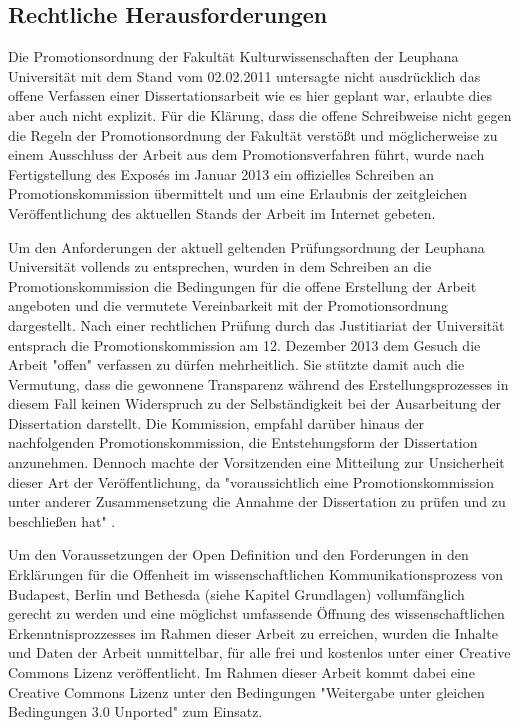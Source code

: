 \subsection{Rechtliche Herausforderungen}

Die Promotionsordnung der Fakultät Kulturwissenschaften der Leuphana Universität mit dem Stand vom 02.02.2011 \cite{promotionsordnung_leuphana_kuwi_2011} untersagte nicht ausdrücklich das offene Verfassen einer Dissertationsarbeit wie es hier geplant war, erlaubte dies aber auch nicht explizit. Für die Klärung, dass die offene Schreibweise nicht gegen die Regeln der Promotionsordnung der Fakultät verstößt und möglicherweise zu einem Ausschluss der Arbeit aus dem Promotionsverfahren führt, wurde nach Fertigstellung des Exposés im Januar 2013 ein offizielles Schreiben an Promotionskommission übermittelt \cite{heise_2013_schreiben_kommission} und um eine Erlaubnis der zeitgleichen Veröffentlichung des aktuellen Stands der Arbeit im Internet gebeten.

Um den Anforderungen der aktuell geltenden Prüfungsordnung der Leuphana Universität vollends zu entsprechen, wurden in dem Schreiben an die Promotionskommission die Bedingungen für die offene Erstellung der Arbeit angeboten und die vermutete Vereinbarkeit mit der Promotionsordnung dargestellt. Nach einer rechtlichen Prüfung durch das Justitiariat der Universität entsprach die Promotionskommission am 12. Dezember 2013 dem Gesuch die Arbeit "offen" verfassen zu dürfen mehrheitlich. Sie stützte damit auch die Vermutung, dass die gewonnene Transparenz während des Erstellungsprozesses in diesem Fall keinen Widerspruch zu der Selbständigkeit bei der Ausarbeitung der Dissertation darstellt. Die Kommission, empfahl darüber hinaus der nachfolgenden Promotionskommission, die Entstehungsform der Dissertation anzunehmen. Dennoch machte der Vorsitzenden eine Mitteilung zur Unsicherheit dieser Art der Veröffentlichung, da "voraussichtlich eine Promotionskommission unter anderer Zusammensetzung die Annahme der Dissertation zu prüfen und zu beschließen hat" \cite{heise_2013_erlaubnis_kommission}.

Um den Voraussetzungen der Open Definition und den Forderungen in den Erklärungen für die Offenheit im wissenschaftlichen Kommunikationsprozess von Budapest, Berlin und Bethesda (siehe Kapitel Grundlagen) vollumfänglich gerecht zu werden und eine möglichst umfassende Öffnung des wissenschaftlichen Erkenntnisprozzesses im Rahmen dieser Arbeit zu erreichen, wurden die Inhalte und Daten der Arbeit unmittelbar, für alle frei und kostenlos unter einer Creative Commons Lizenz veröffentlicht. Im Rahmen dieser Arbeit kommt dabei eine Creative Commons Lizenz unter den Bedingungen "Weitergabe unter gleichen Bedingungen 3.0 Unported" zum Einsatz.

